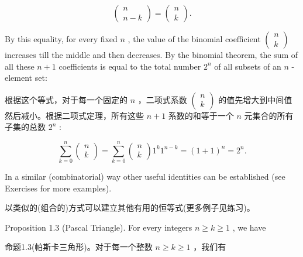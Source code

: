 \documentclass[10pt]{article}
\begin{document}
\[
\left( \begin{matrix} n \\  n - k \end{matrix}\right)  = \left( \begin{array}{l} n \\  k \end{array}\right) . \tag{1.1}
\]

By this equality, for every fixed \(n\) , the value of the binomial coefficient \(\left( \begin{array}{l} n \\  k \end{array}\right)\) increases till the middle and then decreases. By the binomial theorem, the sum of all these \(n + 1\) coefficients is equal to the total number \({2}^{n}\) of all subsets of an \(n\) -element set:

\begin{tcolorbox}\relax
根据这个等式，对于每一个固定的 \(n\) ，二项式系数 \(\left( \begin{array}{l} n \\  k \end{array}\right)\) 的值先增大到中间值然后减小。根据二项式定理，所有这些 \(n + 1\) 系数的和等于一个 \(n\) 元集合的所有子集的总数 \({2}^{n}\) :
\end{tcolorbox}

\[
\mathop{\sum }\limits_{{k = 0}}^{n}\left( \begin{array}{l} n \\  k \end{array}\right)  = \mathop{\sum }\limits_{{k = 0}}^{n}\left( \begin{array}{l} n \\  k \end{array}\right) {1}^{k}{1}^{n - k} = {\left( 1 + 1\right) }^{n} = {2}^{n}.
\]

In a similar (combinatorial) way other useful identities can be established (see Exercises for more examples).

\begin{tcolorbox}\relax
以类似的(组合的)方式可以建立其他有用的恒等式(更多例子见练习)。
\end{tcolorbox}

Proposition 1.3 (Pascal Triangle). For every integers \(n \geq  k \geq  1\) , we have

\begin{tcolorbox}\relax
命题1.3(帕斯卡三角形)。对于每一个整数 \(n \geq  k \geq  1\) ，我们有
\end{tcolorbox}
\end{document}
